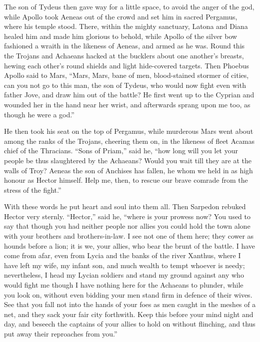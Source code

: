 The son of Tydeus then gave way for a little space, to avoid the anger of
the god, while Apollo took Aeneas out of the crowd and set him in sacred
Pergamus, where his temple stood. There, within the mighty sanctuary,
Latona and Diana healed him and made him glorious to behold, while Apollo
of the silver bow fashioned a wraith in the likeness of Aeneas, and armed
as he was. Round this the Trojans and Achaeans hacked at the bucklers
about one another’s breasts, hewing each other’s round shields and light
hide-covered targets. Then Phoebus Apollo said to Mars, “Mars, Mars, bane
of men, blood-stained stormer of cities, can you not go to this man, the
son of Tydeus, who would now fight even with father Jove, and draw him out
of the battle? He first went up to the Cyprian and wounded her in the hand
near her wrist, and afterwards sprang upon me too, as though he were a
god.”

He then took his seat on the top of Pergamus, while murderous Mars went
about among the ranks of the Trojans, cheering them on, in the likeness of
fleet Acamas chief of the Thracians. “Sons of Priam,” said he, “how long
will you let your people be thus slaughtered by the Achaeans? Would you
wait till they are at the walls of Troy? Aeneas the son of Anchises has
fallen, he whom we held in as high honour as Hector himself. Help me,
then, to rescue our brave comrade from the stress of the fight.”

With these words he put heart and soul into them all. Then Sarpedon
rebuked Hector very sternly. “Hector,” said he, “where is your prowess
now? You used to say that though you had neither people nor allies you
could hold the town alone with your brothers and brothers-in-law. I see
not one of them here; they cower as hounds before a lion; it is we, your
allies, who bear the brunt of the battle. I have come from afar, even from
Lycia and the banks of the river Xanthus, where I have left my wife, my
infant son, and much wealth to tempt whoever is needy; nevertheless, I
head my Lycian soldiers and stand my ground against any who would fight me
though I have nothing here for the Achaeans to plunder, while you look on,
without even bidding your men stand firm in defence of their wives. See
that you fall not into the hands of your foes as men caught in the meshes
of a net, and they sack your fair city forthwith. Keep this before your
mind night and day, and beseech the captains of your allies to hold on
without flinching, and thus put away their reproaches from you.”

